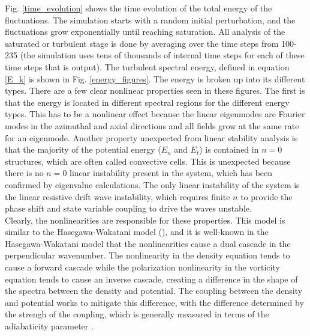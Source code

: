 \documentclass[12pt]{article}
\begin{document}
Fig. \ref{time_evolution} shows the time evolution of the total energy of the fluctuations. The simulation starts with a random initial perturbation, and the fluctuations grow
exponentially until reaching saturation. All analysis of the saturated or turbulent stage is done by averaging over the time steps from 100-235 (the simulation uses tens of thousands of internal
time steps for each of these time steps that is output).
The turbulent spectral energy, defined in equation \ref{E_k} is shown in Fig. \ref{energy_figures}. The energy is broken up into its different types. There are a few clear nonlinear properties
seen in these figures. The first is that the energy is located in different spectral regions for the different energy types. This has to be a nonlinear effect because the linear eigenmodes
are Fourier modes in the azimuthal and axial directions and all fields grow at the same rate for an eigenmode. 
Another property unexpected from linear stability analysis is that the majority of the potential energy ($E_n$ and $E_t$) is contained in $n=0$ structures, which are often called convective cells.
This is unexpected because there is no $n=0$ linear instability present in the system, which has been confirmed by eigenvalue calculations. The only linear instability of the system is the
linear resistive drift wave instability, which requires finite $n$ to provide the phase shift and state variable coupling to drive the waves unstable. \\

Clearly, the nonlinearities are responsible for these properties. This model is similar to the Hasegawa-Wakatani model (\cite{hasegawa1983}), and it is well-known in the Hasegawa-Wakatani
model that the nonlinearities cause a dual cascade in the perpendicular wavenumber. The nonlinearity in the density equation tends to cause a forward cascade while the 
polarization nonlinearity in the vorticity equation tends to cause an inverse cascade, creating a difference in the shape of the spectra between the density and potential.
The coupling between the density and potential works to mitigate this difference, with the difference determined by the strengh of the coupling, which is generally measured in terms
of the adiabaticity parameter \cite{Camargo1995}. \\
\end{document}
